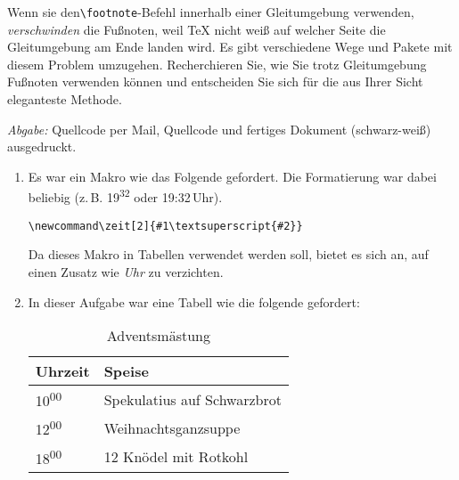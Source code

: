\documentclass{scrartcl}
\newcommand{\abgabe}[1]{\par\noindent\textit{Abgabe:} #1}
\newcommand\zeit[2]{#1\textsuperscript{#2}}
\begin{document}
\begin{question}[subtitle=Adventskalorien]{12}
\begin{enumerate}[resume, label=\alph*)]
		Wenn sie den\texttt{\textbackslash footnote}-Befehl innerhalb einer Gleitumgebung verwenden, \emph{verschwinden} die Fußnoten, weil \TeX{} nicht weiß auf welcher Seite die Gleitumgebung am Ende landen wird. Es gibt verschiedene Wege und Pakete mit diesem Problem umzugehen. Recherchieren Sie, wie Sie trotz Gleitumgebung Fußnoten verwenden können und entscheiden Sie sich für die aus Ihrer Sicht eleganteste Methode.
	\end{enumerate}
	\abgabe{Quellcode per Mail{,} Quellcode und fertiges Dokument (schwarz-weiß) ausgedruckt.}
\end{question}
 

\newsavebox{\SolutionCodeAB}
\begin{lrbox}{\SolutionCodeAB}
\begin{minipage}{\textwidth}
\begin{enumerate}[label=\alph*)]
\item Es war ein Makro wie das Folgende gefordert. Die Formatierung war dabei beliebig (z.\,B. \zeit{19}{32} oder 19:32\,Uhr).
\begin{lstlisting}
\newcommand\zeit[2]{#1\textsuperscript{#2}}
\end{lstlisting}
Da dieses Makro in Tabellen verwendet werden soll, bietet es sich an, auf einen Zusatz wie \emph{Uhr} zu verzichten.
\item In dieser Aufgabe war eine Tabell wie die folgende gefordert:
\begin{LTXexample}[pos=t,preset=\centering]
\begin{table}
  \centering
  \begin{tabular}{ll}
    \toprule
    {\textbf{Uhrzeit}}  &  {\textbf{Speise}}           \\
    \midrule 
    \zeit{10}{00}       &  Spekulatius auf Schwarzbrot \\
    \zeit{12}{00}       &  Weihnachtsganzsuppe         \\
    \zeit{18}{00}       &  12 Knödel mit Rotkohl       \\
    \bottomrule
  \end{tabular}
  \caption{Adventsmästung}
  \label{tab:essen}
\end{table}
\end{LTXexample}
\end{enumerate}
\end{minipage}
\end{lrbox}
\end{document}
